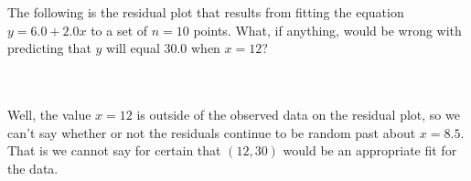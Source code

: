 The following is the residual plot that results from fitting the equation $y=6.0+2.0x$ to a set of
$n=10$ points. What, if anything, would be wrong with predicting that $y$ will equal 30.0 when
$x=12$?\\\\

\begin{solution}\renewcommand{\qedsymbol}{}\ \\
    Well, the value $x=12$ is outside of the observed data on the residual plot, so we can't say whether
    or not the residuals continue to be random past about $x=8.5$. That is we cannot say for certain
    that $(12,30)$ would be an appropriate fit for the data.

\end{solution}